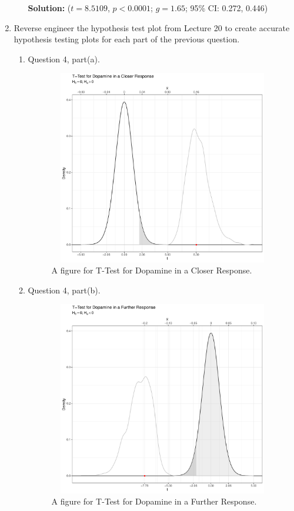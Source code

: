 \documentclass{article}\usepackage[]{graphicx}\usepackage[]{xcolor}
\begin{document}
\begin{enumerate}
\begin{enumerate}
\textbf{Solution:} ($t=8.5109$, $p<0.0001$; $g=1.65$; 95\% CI: 0.272, 0.446)
\end{enumerate}
\item Reverse engineer the hypothesis test plot from Lecture 20 to create accurate
hypothesis testing plots for each part of the previous question.
\begin{enumerate}
  \item Question 4, part(a).
\begin{figure}[H]
\centering
\includegraphics[width=10cm, height=8.5cm]{Rplot.pdf}
\caption{A figure for T-Test for Dopamine in a Closer Response.}
\label{plot1}
\end{figure}

  \item Question 4, part(b).
\begin{figure}[H]
\centering
\includegraphics[width=10cm, height=8.5cm]{Rplot01.pdf}
\caption{A figure for T-Test for Dopamine in a Further Response.}
\label{plot2}
\end{figure}


\end{enumerate}
\end{enumerate}
\end{document}
